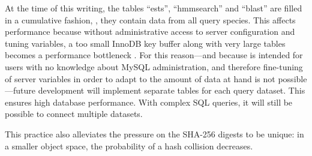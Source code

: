 \label{sec:table-per-species}
At the time of this writing, the tables ``ests'', ``hmmsearch'' and ``blast''
are filled in a cumulative fashion, \ie, they contain data from all query
species. This affects performance because without administrative access to
server configuration and tuning variables, a too small InnoDB key buffer along
with very large tables becomes a performance bottleneck \citep{mysql2013}. For
this reason---and because \pname is intended for users with no knowledge about
MySQL administration, and therefore fine-tuning of server variables in order to
adapt to the amount of data at hand is not possible---future development will
implement separate tables for each query dataset. This ensures high database
performance. With complex SQL queries, it will still be possible to connect
multiple datasets.

This practice also alleviates the pressure on the SHA-256 digests to be unique:
in a smaller object space, the probability of a hash collision decreases.
